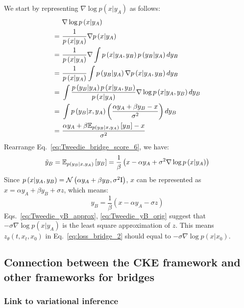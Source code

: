 We start by representing $\nabla\log p\left(x|y_{A}\right)$ as follows:
\begin{align}
 & \nabla\log p\left(x|y_{A}\right)\\
=\  & \frac{1}{p\left(x|y_{A}\right)}\nabla p\left(x|y_{A}\right)\\
=\  & \frac{1}{p\left(x|y_{A}\right)}\nabla\int p\left(x|y_{A},y_{B}\right)p\left(y_{B}|y_{A}\right)dy_{B}\\
=\  & \frac{1}{p\left(x|y_{A}\right)}\int p\left(y_{B}|y_{A}\right)\nabla p\left(x|y_{A},y_{B}\right)dy_{B}\\
=\  & \int\frac{p\left(y_{B}|y_{A}\right)p\left(x|y_{A},y_{B}\right)}{p\left(x|y_{A}\right)}\nabla\log p\left(x|y_{A},y_{B}\right)dy_{B}\\
=\  & \int p\left(y_{B}|x,y_{A}\right)\left(\frac{\alpha y_{A}+\beta y_{B}-x}{\sigma^{2}}\right)dy_{B}\\
=\  & \frac{\alpha y_{A}+\beta\mathbb{E}_{p\left(y_{B}|x,y_{A}\right)}\left[y_{B}\right]-x}{\sigma^{2}}\label{eq:Tweedie_bridge_score_6}
\end{align}
Rearrange Eq.~\ref{eq:Tweedie_bridge_score_6}, we have:
\begin{equation}
\tilde{y}_{B}=\mathbb{E}_{p\left(y_{B}|x,y_{A}\right)}\left[y_{B}\right]=\frac{1}{\beta}\left(x-\alpha y_{A}+\sigma^{2}\nabla\log p\left(x|y_{A}\right)\right)\label{eq:Tweedie_yB_approx}
\end{equation}
Since $p\left(x|y_{A},y_{B}\right)=\mathcal{N}\left(\alpha y_{A}+\beta y_{B},\sigma^{2}\mathrm{I}\right)$,
$x$ can be represented as $x=\alpha y_{A}+\beta y_{B}+\sigma z$,
which means:
\begin{equation}
y_{B}=\frac{1}{\beta}\left(x-\alpha y_{A}-\sigma z\right)\label{eq:Tweedie_yB_orig}
\end{equation}
Eqs.~\ref{eq:Tweedie_yB_approx}, \ref{eq:Tweedie_yB_orig} suggest
that $-\sigma\nabla\log p\left(x|y_{A}\right)$ is the least square
approximation of $z$. This means $z_{\theta}\left(t,x_{t},x_{0}\right)$
in Eq.~\ref{eq:loss_bridge_2} should equal to $-\sigma\nabla\log p\left(x|x_{0}\right)$.

\subsection{Connection between the CKE framework and other frameworks for bridges\label{subsec:Connection-between-the-CKE-framework}}

\subsubsection{Link to variational inference}

